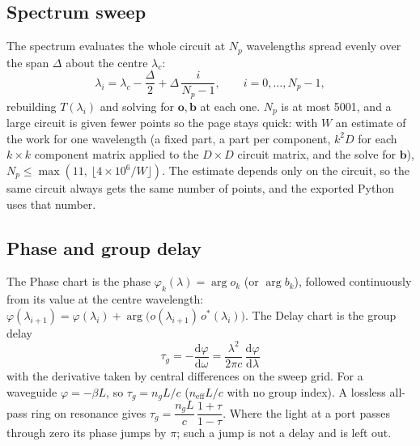 \documentclass[10pt,a4paper]{article}
\newcommand{\dd}{\mathrm{d}}
\begin{document}
\subsection{Spectrum sweep}
The spectrum evaluates the whole circuit at $N_p$ wavelengths spread evenly over the span $\Delta$ about the centre $\lambda_c$:
\[
  \lambda_i = \lambda_c - \frac{\Delta}{2} + \Delta\,\frac{i}{N_p-1},\qquad i = 0,\dots,N_p-1,
\]
rebuilding $T(\lambda_i)$ and solving for $\mathbf{o},\mathbf{b}$ at each one. $N_p$ is at most 5001, and a large circuit is given
fewer points so the page stays quick: with $W$ an estimate of the work for one wavelength (a fixed part, a part per component,
$k^2 D$ for each $k\times k$ component matrix applied to the $D\times D$ circuit matrix, and the solve for $\mathbf{b}$),
$N_p \le \max(11,\ \lfloor 4\times10^{6}/W\rfloor)$. The estimate depends only on the circuit, so the same circuit always gets the same
number of points, and the exported Python uses that number.

\subsection{Phase and group delay}
The Phase chart is the phase $\varphi_k(\lambda) = \arg o_k$ (or $\arg b_k$), followed continuously from its value at the centre
wavelength: $\varphi(\lambda_{i+1}) = \varphi(\lambda_i) + \arg\!\bigl(o(\lambda_{i+1})\,o^{*}(\lambda_i)\bigr)$. The Delay chart is the group delay
\[
  \boxed{\,\tau_g = -\frac{\dd\varphi}{\dd\omega} = \frac{\lambda^{2}}{2\pi c}\,\frac{\dd\varphi}{\dd\lambda}\,}
\]
with the derivative taken by central differences on the sweep grid. For a waveguide $\varphi=-\beta L$, so $\tau_g = n_g L/c$
($n_{\text{eff}}L/c$ with no group index). A lossless all-pass ring on resonance gives $\tau_g = \dfrac{n_g L}{c}\,\dfrac{1+\tau}{1-\tau}$.
Where the light at a port passes through zero its phase jumps by $\pi$; such a jump is not a delay and is left out.
\end{document}
